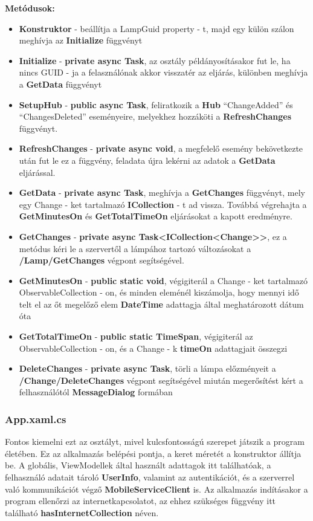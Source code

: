 \documentclass[a4paper,12pt]{report}
\begin{document}
    \textbf{Metódusok:}

    \begin{itemize}
        \item \textbf{Konstruktor} - beállítja a LampGuid property - t, majd egy külön szálon meghívja az \textbf{Initialize} függvényt
        \item \textbf{Initialize} - \textbf{private async Task}, az osztály példányosításakor fut le, ha nincs GUID - ja a felasználónak akkor
        visszatér az eljárás, különben meghívja a \textbf{GetData} függvényt
        \item \textbf{SetupHub} - \textbf{public async Task}, feliratkozik a \textbf{Hub} ``ChangeAdded'' és ``ChangesDeleted'' eseményeire,
        melyekhez hozzáköti a \textbf{RefreshChanges} függvényt.
        \item \textbf{RefreshChanges} - \textbf{private async void}, a megfelelő esemény bekövetkezte után fut le ez a függvény, feladata
        újra lekérni az adatok a \textbf{GetData} eljárással.
        \item \textbf{GetData} - \textbf{private async Task}, meghívja a \textbf{GetChanges} függvényt, mely egy Change - ket tartalmazó
        \textbf{ICollection} - t ad vissza. Továbbá végrehajta a \textbf{GetMinutesOn} és \textbf{GetTotalTimeOn} eljárásokat a kapott eredményre.
        \item \textbf{GetChanges} - \textbf{private async Task<ICollection<Change>>}, ez a metódus kéri le a szervertől a lámpához tartozó változásokat a
        \textbf{/Lamp/GetChanges} végpont segítségével.
        \item \textbf{GetMinutesOn} - \textbf{public static void}, végigiterál a Change - ket tartalmazó ObservableCollection - on, és minden eleménél
        kiszámolja, hogy mennyi idő telt el az őt megelőző elem \textbf{DateTime} adattagja által meghatározott dátum óta
        \item \textbf{GetTotalTimeOn} - \textbf{public static TimeSpan}, végigiterál az ObservableCollection - on, és a Change - k \textbf{timeOn} adattagjait
        összegzi
        \item \textbf{DeleteChanges} - \textbf{private async Task}, törli a lámpa előzményeit a \textbf{/Change/DeleteChanges} végpont segítségével
        miután megerősítést kért a felhasználótól \textbf{MessageDialog} formában
    \end{itemize}

    \subsubsection{App.xaml.cs}
    Fontos kiemelni ezt az osztályt, mivel kulcsfontosságú szerepet játszik a program életében. Ez az alkalmazás belépési pontja,
    a keret méretét a konstruktor állítja be. A globális, ViewModellek által használt adattagok itt találhatóak, a felhasználó adatait
    tároló \textbf{UserInfo}, valamint az autentikációt, és a szerverrel való kommunikációt végző \textbf{MobileServiceClient} is.
    Az alkalmazás indításakor a program ellenőrzi az internetkapcsolatot, az ehhez szükséges függvény itt található \textbf{hasInternetCollection}
    néven.
\end{document}
